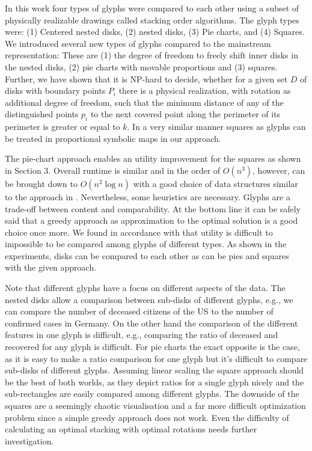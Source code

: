\documentclass[a4paper,11pt]{article}
\begin{document}
In this work four types of glyphs were compared to each other using a subset of physically realizable drawings called stacking order algorithms. The glyph types were: (1) Centered nested disks, (2) nested disks, (3) Pie charts, and (4) Squares.
We introduced several new types of glyphs compared to the mainstream representation: These are (1) the degree of freedom to freely shift inner disks in the nested disks, (2) pie charts with movable proportions and (3) squares.
Further, we have shown that it is NP-hard to decide, whether for a given set $D$ of disks with boundary points $P_i$ there is a physical realization, with rotation as additional degree of freedom, such that the minimum distance of any of the distinguished points $p_i$ to the next covered point along the perimeter of its perimeter is greater or equal to $k$. In a very similar manner squares as glyphs can be treated in proportional symbolic maps in our approach.

The pie-chart approach enables an utility improvement for the squares as shown in Section 3. Overall runtime is similar and in the order of $O(n^3)$, however, can be brought down to $O(n^2 \log n)$ with a good choice of data structures similar to the approach in \cite{cabello}.
Nevertheless, some heuristics are necessary. Glyphs are a trade-off between content and comparability. At the bottom line it can be safely said that a greedy approach as approximation to the optimal solution is a good choice once more.
We found in accordance with \cite{tufte} that utility is difficult to impossible to be compared among glyphs of different types. As shown in the experiments, disks can be compared to each other as can be pies and squares with the given approach.

Note that different glyphs have a focus on different aspects of the data. The nested disks allow a comparison between sub-disks of different glyphs, e.g., we can compare the number of deceased citizens of the US to the number of confirmed cases in Germany. On the other hand the comparison of the different features in one glyph is difficult, e.g., comparing the ratio of deceased and recovered for any glyph is difficult. For pie charts the exact opposite is the case, as it is easy to make a ratio comparison for one glyph but it's difficult to compare sub-disks of different glyphs. Assuming linear scaling the square approach should be the best of both worlds, as they depict ratios for a single glyph nicely and the sub-rectangles are easily compared among different glyphs. The downside of the squares are a seemingly chaotic visualisation and a far more difficult optimization problem since a simple greedy approach does not work. Even the difficulty of calculating an optimal stacking with optimal rotations needs further investigation.
\end{document}
